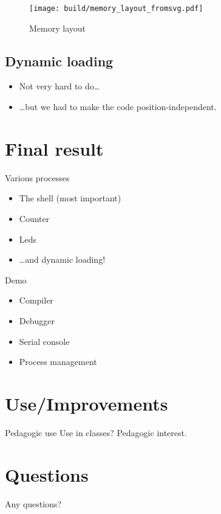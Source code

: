 \documentclass{beamer}
\begin{document}
    \begin{frame}[plain]
      \begin{figure}
        \begin{minipage}[c]{0.5\textwidth}
          \caption{Memory layout}
        \end{minipage}\hfill
        \begin{minipage}[c]{0.5\textwidth}
          \texttt{[image: build/memory\_layout\_fromsvg.pdf]}
        \end{minipage}
      \end{figure}
    \end{frame}

    \subsection{Dynamic loading}
      \begin{frame}
        \begin{itemize}
          \item Not very hard to do\dots
          \item \dots but we had to make the code position-independent.
        \end{itemize}
      \end{frame}

  \section{Final result}
    \begin{frame}{Various processes}
      \begin{itemize}
        \item The shell (most important)
        \item Counter
        \item Leds
        \item \dots and dynamic loading!
      \end{itemize}
    \end{frame}

    \begin{frame}{Demo}
      \begin{itemize}
        \item Compiler
        \item Debugger
        \item Serial console
        \item Process management
      \end{itemize}
    \end{frame}

  \section{Use/Improvements}
    \begin{frame}{Pedagogic use}
        Use in classes? Pedagogic interest.
    \end{frame}

  \section{Questions}
    \begin{frame}
      Any questions?
    \end{frame}
\end{document}
